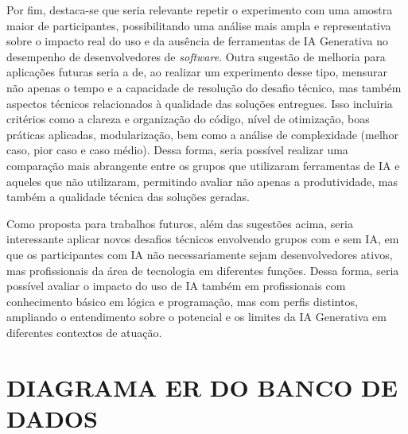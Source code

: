 \documentclass[english,brazilian]{UNISINOSartigo} %
\begin{document}
Por fim, destaca-se que seria relevante repetir o experimento com uma amostra maior de participantes, possibilitando uma análise mais ampla e representativa sobre o impacto real do uso e da ausência de ferramentas de IA Generativa no desempenho de desenvolvedores de \textit{software}. Outra sugestão de melhoria para aplicações futuras seria a de, ao realizar um experimento desse tipo, mensurar não apenas o tempo e a capacidade de resolução do desafio técnico, mas também aspectos técnicos relacionados à qualidade das soluções entregues. Isso incluiria critérios como a clareza e organização do código, nível de otimização, boas práticas aplicadas, modularização, bem como a análise de complexidade (melhor caso, pior caso e caso médio). Dessa forma, seria possível realizar uma comparação mais abrangente entre os grupos que utilizaram ferramentas de IA e aqueles que não utilizaram, permitindo avaliar não apenas a produtividade, mas também a qualidade técnica das soluções geradas.

Como proposta para trabalhos futuros, além das sugestões acima, seria interessante aplicar novos desafios técnicos envolvendo grupos com e sem IA, em que os participantes com IA não necessariamente sejam desenvolvedores ativos, mas profissionais da área de tecnologia em diferentes funções. Dessa forma, seria possível avaliar o impacto do uso de IA também em profissionais com conhecimento básico em lógica e programação, mas com perfis distintos, ampliando o entendimento sobre o potencial e os limites da IA Generativa em diferentes contextos de atuação.



\appendix
\section{DIAGRAMA ER DO BANCO DE DADOS}

\renewcommand{\thefigure}{A.\arabic{figure}}
\setcounter{figure}{0}
\end{document}
